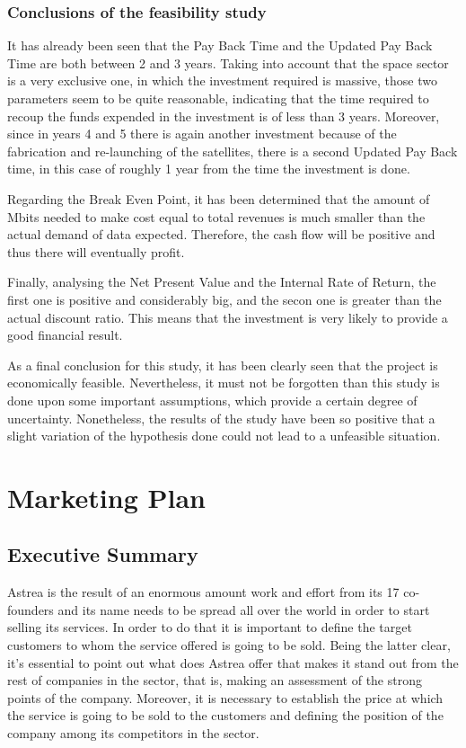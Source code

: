\subsection{Conclusions of the feasibility study}
It has already been seen that the Pay Back Time and the Updated Pay Back Time are both between 2 and 3 years. Taking into account that the space sector is a very exclusive one, in which the investment required is massive, those two parameters seem to be quite reasonable, indicating that the time required to recoup the funds expended in the investment is of less than 3 years. Moreover, since in years 4 and 5 there is again another investment because of the fabrication and re-launching of the satellites, there is a second Updated Pay Back time, in this case of roughly 1 year from the time the investment is done.

Regarding the Break Even Point, it has been determined that the amount of Mbits needed to make cost equal to total revenues is much smaller than the actual demand of data expected. Therefore, the cash flow will be positive and thus there will eventually profit.

Finally, analysing the Net Present Value and the Internal Rate of Return, the first one is positive and considerably big, and the secon one is greater than the actual discount ratio. This means that the investment is very likely to provide a good financial result.

As a final conclusion for this study, it has been clearly seen that the project is economically feasible. Nevertheless, it must not be forgotten than this study is done upon some important assumptions, which provide a certain degree of uncertainty. Nonetheless, the results of the study have been so positive that a slight variation of the hypothesis done could not lead to a unfeasible situation. 

\chapter{Marketing Plan}

\section{Executive Summary}
Astrea is the result of an enormous amount work and effort from its 17 co-founders and its name needs to be spread all over the world in order to start selling its services. In order to do that it is important to define the target customers to whom the service offered is going to be sold. Being the latter clear, it's essential to point out what does Astrea offer that makes it stand out from the rest of companies in the sector, that is, making an assessment of the strong points of the company. Moreover, it is necessary to establish the price at which the service is going to be sold to the customers and defining the position of the company among its competitors in the sector.

